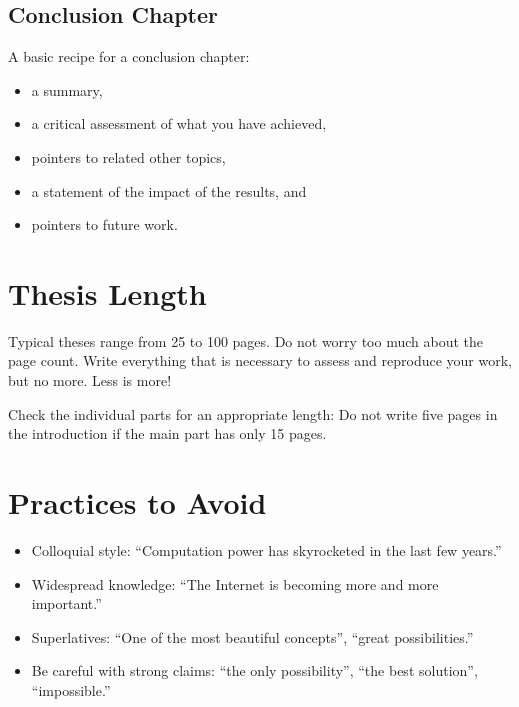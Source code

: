 \subsection{Conclusion Chapter}

A basic recipe for a conclusion chapter:
\begin{itemize}
\item a summary,
\item a critical assessment of what you have achieved,
\item pointers to related other topics,
\item a statement of the impact of the results, and
\item pointers to future work.
\end{itemize}

\section{Thesis Length}

Typical theses range from 25 to 100 pages. Do not worry too much about the page count. Write everything that is necessary to assess and reproduce your work, but no more. Less is more!

Check the individual parts for an appropriate length: Do not write five pages in the introduction if the main part has only 15 pages.


\section{Practices to Avoid}

\begin{itemize}
\item Colloquial style: “Computation power has skyrocketed in the last few years.”
\item Widespread knowledge: “The Internet is becoming more and more important.”
\item Superlatives: “One of the most beautiful concepts”, “great possibilities.”
\item Be careful with strong claims: “the only possibility”, “the best solution”, “impossible.”
\end{itemize}